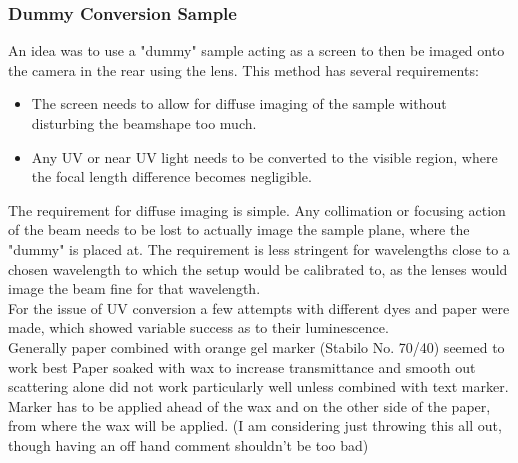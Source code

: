 \documentclass[twoside,openright]{scrreprt}
\begin{document}
\subsubsection{Dummy Conversion Sample}
An idea was to use a "dummy" sample acting as a screen to then be imaged onto the camera in the rear using the lens. This method has several requirements:
\begin{itemize}
\item The screen needs to allow for diffuse imaging of the sample without disturbing the beamshape too much.
\item Any UV or near UV light needs to be converted to the visible region, where the focal length difference becomes negligible.
\end{itemize}

The requirement for diffuse imaging is simple. Any collimation or focusing action of the beam needs to be lost to actually image the sample plane, where the "dummy" is placed at. The requirement is less stringent for wavelengths close to a chosen wavelength to which the setup would be calibrated to, as the lenses would image the beam fine for that wavelength.\\

For the issue of UV conversion a few attempts with different dyes and paper were made, which showed variable success as to their luminescence.\\
Generally paper combined with orange gel marker (Stabilo No. 70/40) seemed to work best
Paper soaked with wax to increase transmittance and smooth out scattering alone did not work particularly well unless combined with text marker. Marker has to be applied ahead of the wax and on the other side of the paper, from where the wax will be applied. (I am considering just throwing this all out, though having an off hand comment shouldn't be too bad) 
\end{document}
